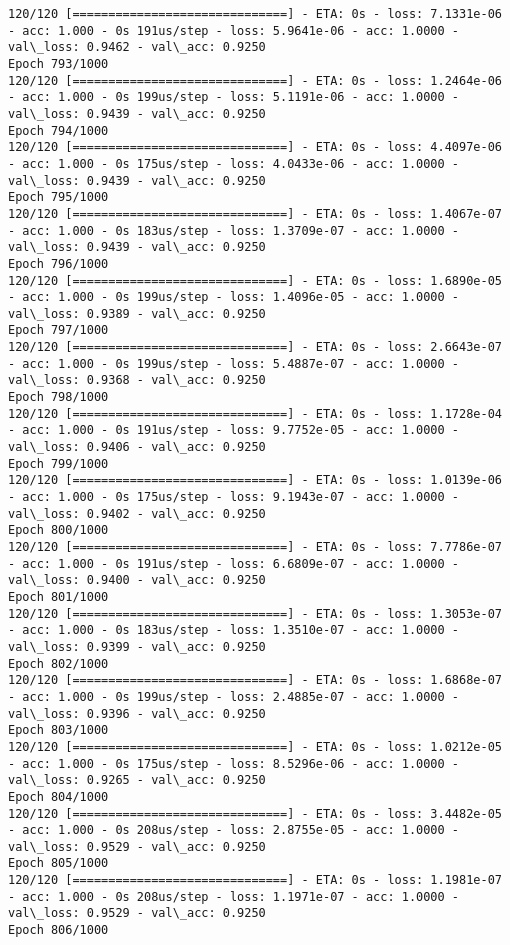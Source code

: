\documentclass[11pt]{article}
\begin{document}
\begin{Verbatim}[commandchars=\\\{\}]
120/120 [==============================] - ETA: 0s - loss: 7.1331e-06 - acc: 1.000 - 0s 191us/step - loss: 5.9641e-06 - acc: 1.0000 - val\_loss: 0.9462 - val\_acc: 0.9250
Epoch 793/1000
120/120 [==============================] - ETA: 0s - loss: 1.2464e-06 - acc: 1.000 - 0s 199us/step - loss: 5.1191e-06 - acc: 1.0000 - val\_loss: 0.9439 - val\_acc: 0.9250
Epoch 794/1000
120/120 [==============================] - ETA: 0s - loss: 4.4097e-06 - acc: 1.000 - 0s 175us/step - loss: 4.0433e-06 - acc: 1.0000 - val\_loss: 0.9439 - val\_acc: 0.9250
Epoch 795/1000
120/120 [==============================] - ETA: 0s - loss: 1.4067e-07 - acc: 1.000 - 0s 183us/step - loss: 1.3709e-07 - acc: 1.0000 - val\_loss: 0.9439 - val\_acc: 0.9250
Epoch 796/1000
120/120 [==============================] - ETA: 0s - loss: 1.6890e-05 - acc: 1.000 - 0s 199us/step - loss: 1.4096e-05 - acc: 1.0000 - val\_loss: 0.9389 - val\_acc: 0.9250
Epoch 797/1000
120/120 [==============================] - ETA: 0s - loss: 2.6643e-07 - acc: 1.000 - 0s 199us/step - loss: 5.4887e-07 - acc: 1.0000 - val\_loss: 0.9368 - val\_acc: 0.9250
Epoch 798/1000
120/120 [==============================] - ETA: 0s - loss: 1.1728e-04 - acc: 1.000 - 0s 191us/step - loss: 9.7752e-05 - acc: 1.0000 - val\_loss: 0.9406 - val\_acc: 0.9250
Epoch 799/1000
120/120 [==============================] - ETA: 0s - loss: 1.0139e-06 - acc: 1.000 - 0s 175us/step - loss: 9.1943e-07 - acc: 1.0000 - val\_loss: 0.9402 - val\_acc: 0.9250
Epoch 800/1000
120/120 [==============================] - ETA: 0s - loss: 7.7786e-07 - acc: 1.000 - 0s 191us/step - loss: 6.6809e-07 - acc: 1.0000 - val\_loss: 0.9400 - val\_acc: 0.9250
Epoch 801/1000
120/120 [==============================] - ETA: 0s - loss: 1.3053e-07 - acc: 1.000 - 0s 183us/step - loss: 1.3510e-07 - acc: 1.0000 - val\_loss: 0.9399 - val\_acc: 0.9250
Epoch 802/1000
120/120 [==============================] - ETA: 0s - loss: 1.6868e-07 - acc: 1.000 - 0s 199us/step - loss: 2.4885e-07 - acc: 1.0000 - val\_loss: 0.9396 - val\_acc: 0.9250
Epoch 803/1000
120/120 [==============================] - ETA: 0s - loss: 1.0212e-05 - acc: 1.000 - 0s 175us/step - loss: 8.5296e-06 - acc: 1.0000 - val\_loss: 0.9265 - val\_acc: 0.9250
Epoch 804/1000
120/120 [==============================] - ETA: 0s - loss: 3.4482e-05 - acc: 1.000 - 0s 208us/step - loss: 2.8755e-05 - acc: 1.0000 - val\_loss: 0.9529 - val\_acc: 0.9250
Epoch 805/1000
120/120 [==============================] - ETA: 0s - loss: 1.1981e-07 - acc: 1.000 - 0s 208us/step - loss: 1.1971e-07 - acc: 1.0000 - val\_loss: 0.9529 - val\_acc: 0.9250
Epoch 806/1000

\end{Verbatim}
\end{document}
